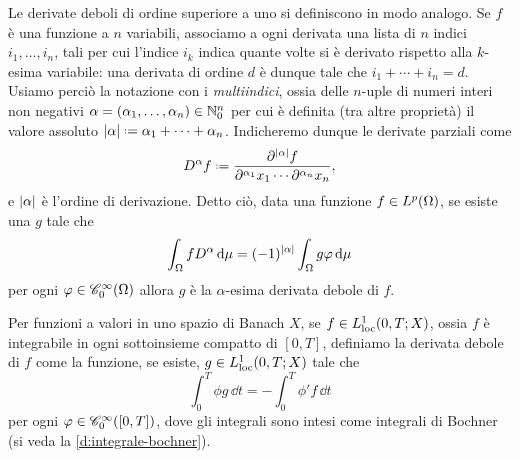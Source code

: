 Le derivate deboli di ordine superiore a uno si definiscono in modo analogo.
Se $f$ è una funzione a $n$ variabili, associamo a ogni derivata una lista di $n$ indici $i_1,\dotsc,i_n$, tali per cui l'indice $i_k$ indica quante volte si è derivato rispetto alla $k$-esima variabile: una derivata di ordine $d$ è dunque tale che $i_1+\dotsb+i_n=d$.
Usiamo perciò la notazione con i \emph{multiindici}, ossia delle $n$-uple di numeri interi non negativi $\alpha=(\alpha_1,\dotsc,\alpha_n)\in\N_0^n$ per cui è definita (tra altre proprietà) il valore assoluto $\abs{\alpha}\defeq\alpha_1+\dotsb+\alpha_n$.
Indicheremo dunque le derivate parziali come
\begin{equation}
    D^\alpha f\defeq\frac{\partial^{\abs{\alpha}}f}{\partial^{\alpha_1}x_1\dotsm\partial^{\alpha_n}x_n},
\end{equation}
e $\abs{\alpha}$ è l'ordine di derivazione.
Detto ciò, data una funzione $f\in\leb[p]{\Omega}$, se esiste una $g$ tale che
\begin{equation}
    \int_\Omega fD^\alpha\,\dd\mu=(-1)^{\abs{\alpha}}\int_\Omega g\phi\,\dd\mu
\end{equation}
per ogni $\phi\in\contsc[\infty]{\Omega}$ allora $g$ è la $\alpha$-esima derivata debole di $f$.

Per funzioni a valori in uno spazio di Banach $X$, se $f\in\locleb[1]{0,T;X}$, ossia $f$ è integrabile in ogni sottoinsieme compatto di $[0,T]$, definiamo la derivata debole di $f$ come la funzione, se esiste, $g\in\locleb[1]{0,T;X}$ tale che
\begin{equation}
    \int_0^T \phi g\,\dd t=-\int_0^T \phi'f\,\dd t
    \label{eq:derivata-debole-banach}
\end{equation}
per ogni $\phi\in\contsc[\infty]{[0,T]}$, dove gli integrali sono intesi come integrali di Bochner (si veda la \ref{d:integrale-bochner}).

